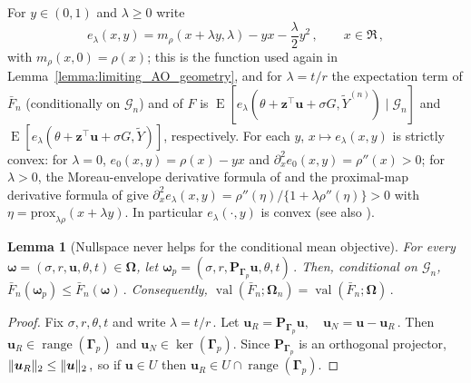 \documentclass{article}
\makeatletter
\DeclareMathOperator{\expect}{E}
\newtheorem{lemma}{Lemma}
\theoremstyle{definition}
\newcommand{\vnorm}[1]{%
	\ensuremath{%
		\if@display
		\left\| #1 \right\|
		\else
		\| #1 \|
		\fi
	}%
}
\newcommand*{\bb}{\boldsymbol}
\newcommand{\prox}[2]{\ensuremath{\textrm{prox}_{#1}\left(#2\right)}}
\def\bu{\bb{u}}
\def\Ytil{\widetilde{Y}}
\def\bz{\bb{z}}
\newcommand{\range}{\operatorname{range}}
\makeatother
\begin{document}
\begin{bibunit}

	For $y\in(0,1)$ and $\lambda\geq0$ write
	$$
		e_\lambda(x,y)
		=
		m_\rho(x+\lambda y,\lambda)-yx-\frac{\lambda}{2}y^2\,,
		\qquad x\in\Re\,,
	$$
	with $m_\rho(x,0)=\rho(x)$; this is the function used again in Lemma~\ref{lemma:limiting_AO_geometry}, and for $\lambda=t/r$ the expectation term of $\bar F_n$ (conditionally on $\mathcal G_n$) and of $F$ is $\expect[e_\lambda(\theta+\bz^\top\bu+\sigma G,\Ytil^{(n)})\mid\mathcal G_n]$ and $\expect[e_\lambda(\theta+\bz^\top\bu+\sigma G,\Ytil)]$, respectively.
	For each $y$, $x\mapsto e_\lambda(x,y)$ is strictly convex: for $\lambda=0$, $e_0(x,y)=\rho(x)-yx$ and $\partial_x^2e_0(x,y)=\rho''(x)>0$; for $\lambda>0$, the Moreau-envelope derivative formula of \citet[Lemma~2, equation~(29)]{salehi+et+al:2019} and the proximal-map derivative formula of \citet[Proposition~6.3]{donoho+montanari:2016} give $\partial_x^2e_\lambda(x,y)=\rho''(\eta)/\{1+\lambda\rho''(\eta)\}>0$ with $\eta=\prox{\lambda\rho}{x+\lambda y}$. In particular $e_\lambda(\cdot,y)$ is convex (see also \citealt[][Chapter~6]{beck:2017}).

	\begin{lemma}[Nullspace never helps for the conditional mean objective]
		\label{lemma:nullspace_no_help_barFn}
		For every $\bb\omega=(\sigma,r,\bu,\theta,t)\in\bb\Omega$, let $\bb\omega_p = (\sigma,r,\bb P_{\bb \Gamma_p}\bu,\theta,t)\,.$
		Then, conditional on $\mathcal G_n$, $\bar F_n(\bb\omega_p) \leq \bar F_n(\bb\omega)\,.$
		Consequently, $\operatorname{val}(\bar F_n;\bb\Omega_n) = \operatorname{val}(\bar F_n;\bb\Omega)\,.$
	\end{lemma}

	\begin{proof}
		Fix $\sigma,r,\theta,t$ and write $\lambda=t/r\,.$
	Let $\bu_R=\bb P_{\bb \Gamma_p}\bu, \quad \bu_N=\bu-\bu_R\,.$
	Then $\bu_R\in\range(\bb\Gamma_p)$ and $\bu_N\in\ker(\bb\Gamma_p)$. Since $\bb P_{\bb \Gamma_p}$ is an orthogonal projector, $\vnorm{\bu_R}_2\leq\vnorm{\bu}_2\,,$
	so if $\bu\in U$ then $\bu_R\in U\cap\range(\bb\Gamma_p)$.


\end{proof}
\end{bibunit}
\end{document}

